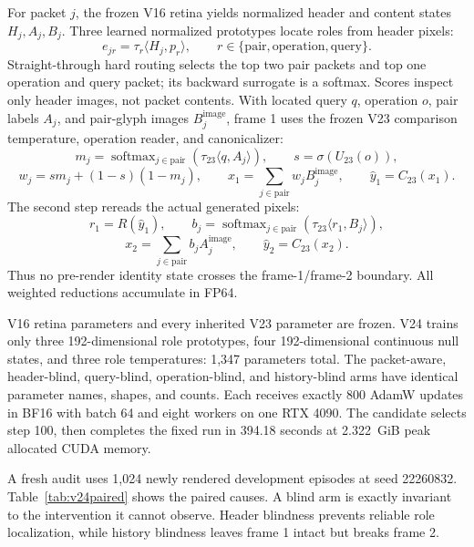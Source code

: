 \documentclass[11pt]{article}
\begin{document}
For packet $j$, the frozen V16 retina yields normalized header and content
states $H_j,A_j,B_j$. Three learned normalized prototypes locate roles from
header pixels:
\[
e_{jr}=\tau_r\langle H_j,p_r\rangle,
\qquad r\in\{\mathrm{pair},\mathrm{operation},\mathrm{query}\}.
\]
Straight-through hard routing selects the top two pair packets and top one
operation and query packet; its backward surrogate is a softmax. Scores inspect
only header images, not packet contents. With located query $q$, operation $o$,
pair labels $A_j$, and pair-glyph images $B_j^{\mathrm{image}}$, frame 1 uses
the frozen V23 comparison temperature, operation reader, and canonicalizer:
\[
m_j=\operatorname{softmax}_{j\in\mathrm{pair}}
\left(\tau_{23}\langle q,A_j\rangle\right),\qquad
s=\sigma(U_{23}(o)),
\]
\[
w_j=s m_j+(1-s)(1-m_j),\qquad
x_1=\sum_{j\in\mathrm{pair}}w_jB_j^{\mathrm{image}},\qquad
\hat y_1=C_{23}(x_1).
\]
The second step rereads the actual generated pixels:
\[
r_1=R(\hat y_1),\qquad
b_j=\operatorname{softmax}_{j\in\mathrm{pair}}
\left(\tau_{23}\langle r_1,B_j\rangle\right),
\]
\[
x_2=\sum_{j\in\mathrm{pair}}b_jA_j^{\mathrm{image}},\qquad
\hat y_2=C_{23}(x_2).
\]
Thus no pre-render identity state crosses the frame-1/frame-2 boundary. All
weighted reductions accumulate in FP64.

V16 retina parameters and every inherited V23 parameter are frozen. V24 trains
only three 192-dimensional role prototypes, four 192-dimensional continuous
null states, and three role temperatures: 1,347 parameters total. The
packet-aware, header-blind, query-blind, operation-blind, and history-blind
arms have identical parameter names, shapes, and counts. Each receives exactly
800 AdamW updates in BF16 with batch 64 and eight workers on one RTX 4090. The
candidate selects step 100, then completes the fixed run in 394.18 seconds at
2.322~GiB peak allocated CUDA memory.

A fresh audit uses 1,024 newly rendered development episodes at seed 22260832.
Table~\ref{tab:v24paired} shows the paired causes. A blind arm is exactly
invariant to the intervention it cannot observe. Header blindness prevents
reliable role localization, while history blindness leaves frame 1 intact but
breaks frame 2.
\end{document}
